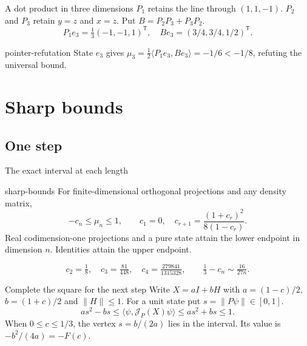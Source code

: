 \documentclass{beamer}
\begin{document}
\begin{frame}{A dot product in three dimensions}
$P_1$ retains the line through $(1,1,-1)$. $P_2$ and $P_3$ retain $y=z$ and $x=z$. Put $B=P_2P_3+P_3P_2$.
\[
 P_1e_3=\tfrac13(-1,-1,1)^{\mathsf T},\quad
 Be_3=(3/4,3/4,1/2)^{\mathsf T}.
\]
\begin{bookresult}{pointer-refutation}
State $e_3$ gives $\mu_3=\tfrac12\langle P_1e_3,Be_3\rangle=-1/6<-1/8$, refuting the universal bound.
\end{bookresult}
\end{frame}

\section{Sharp bounds}
\subsection{One step}
\begin{frame}{The exact interval at each length}
\begin{bookresult}{sharp-bounds}
For finite-dimensional orthogonal projections and any density matrix,
\[
 -c_n\le\mu_n\le1,\qquad c_1=0,\quad c_{r+1}=\frac{(1+c_r)^2}{8(1-c_r)}.
\]
Real codimension-one projections and a pure state attain the lower endpoint in dimension $n$. Identities attain the upper endpoint.
\end{bookresult}
\[
 c_2=\tfrac18,\quad c_3=\tfrac{81}{448},\quad c_4=\tfrac{279841}{1315328},
 \qquad \tfrac13-c_n\sim\tfrac{16}{27n}.
\]
\end{frame}

\begin{frame}{Complete the square for the next step}
Write $X=aI+bH$ with $a=(1-c)/2$, $b=(1+c)/2$ and $\|H\|\le1$. For a unit state put $s=\|P\psi\|\in[0,1]$.
\[
 as^2-bs\le\langle\psi,\mathcal J_P(X)\psi\rangle\le as^2+bs\le1.
\]
When $0\le c\le1/3$, the vertex $s=b/(2a)$ lies in the interval. Its value is $-b^2/(4a)=-F(c)$.
\end{frame}
\end{document}
